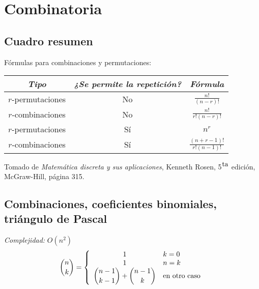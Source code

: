 \documentclass[10pt,letterpaper]{article}
\begin{document}
\bigskip


\section{Combinatoria}
\subsection{Cuadro resumen}
Fórmulas para combinaciones y permutaciones:
\begin{center}
\renewcommand{\arraystretch}{2} %
\begin{tabular}{| c | c | c |}
\hline
\textit{Tipo} & \textit{¿Se permite la repetición?} & \textit{Fórmula} \\ [1.5ex]
\hline\hline

$r$-permutaciones & No & $ \displaystyle\frac{n!}{(n-r)!} $ \\ [1.5ex]
\hline
$r$-combinaciones & No & $ \displaystyle\frac{n!}{r!(n-r)!} $ \\  [1.5ex]
\hline
$r$-permutaciones & Sí & $ \displaystyle n^{r} $ \\
\hline
$r$-combinaciones & Sí & $ \displaystyle\frac{(n+r-1)!}{r!(n-1)!} $ \\ [1.5ex]
\hline
\end{tabular}
\renewcommand{\arraystretch}{1}
\end{center}
Tomado de \textit{Matemática discreta y sus aplicaciones}, Kenneth Rosen, 5${}^{\hbox{ta}}$ edición, McGraw-Hill, página 315.

\subsection{Combinaciones, coeficientes binomiales, triángulo de Pascal}
\emph{Complejidad:} $ O(n^2) $ \\
$$ {n \choose k} = \left\{
\begin{array}{c l}
 1 & k = 0\\
 1 & n = k\\
 \displaystyle {n - 1 \choose k - 1} + {n - 1 \choose k} & \mbox{en otro caso}\\
\end{array}
\right.
$$

\end{document}
